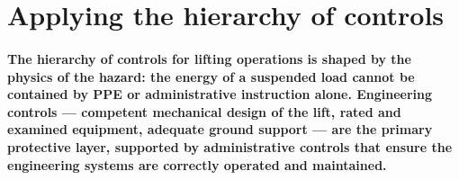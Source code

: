 \section{Applying the hierarchy of controls}

\paragraph{The hierarchy of controls for lifting operations is shaped by the physics of the hazard: the energy of a suspended load cannot be contained by PPE or administrative instruction alone. Engineering controls --- competent mechanical design of the lift, rated and examined equipment, adequate ground support --- are the primary protective layer, supported by administrative controls that ensure the engineering systems are correctly operated and maintained.}

